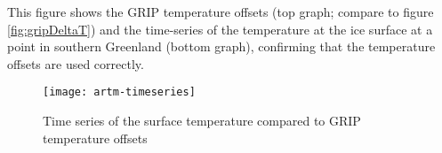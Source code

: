 This figure shows the GRIP temperature offsets (top graph; compare to figure \ref{fig:gripDeltaT}) and the time-series of the temperature at the ice surface at a point in southern Greenland (bottom graph), confirming that the temperature offsets are used correctly.

\begin{figure}[ht]
  \centering
  \texttt{[image: artm-timeseries]}
  \caption{Time series of the surface temperature compared to GRIP temperature offsets}
  \label{fig:artm-timeseries}
\end{figure}

\begin{comment}
  FIXME: Variable acab in following is worth looking at. It looks right and it
  may be possible to compare to other paleo-limate studies:
\begin{verbatim}
$ pclimate -i green20km_y1.nc -o bar.nc -ys -125000.0 -ye -0.0 -dt 1000.0 \
           -dTforcing grip_dT.nc -dSLforcing specmap_dSL.nc \
           -atmosphere eismint_greenland,dTforcing -surface pdd -ocean constant,dSLforcing
\end{verbatim}%
\end{comment}


